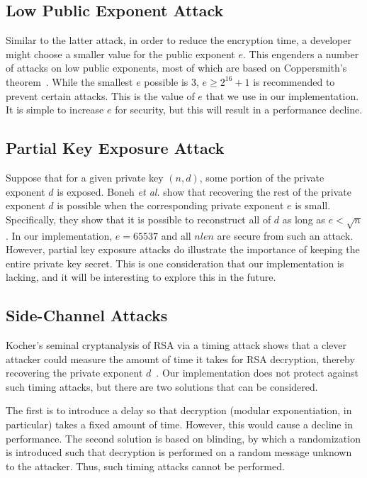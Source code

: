 \documentclass[a4paper]{article}
\begin{document}
\subsection{Low Public Exponent Attack}

Similar to the latter attack, in order to reduce the encryption time, a developer might choose a smaller value for the public exponent $e$. This engenders a number of attacks on low public exponents, most of which are based on Coppersmith's theorem~\cite{coppersmith1997small}. While the smallest $e$ possible is 3, $e \geq 2^{16} + 1$ is recommended to prevent certain attacks. This is the value of $e$ that we use in our implementation. It is simple to increase $e$ for security, but this will result in a performance decline.

\subsection{Partial Key Exposure Attack}

Suppose that for a given private key $(n,d)$, some portion of the private exponent $d$ is exposed. Boneh \emph{et al.} show that recovering the rest of the private exponent $d$ is possible when the corresponding private exponent $e$ is small. Specifically, they show that it is possible to reconstruct all of $d$ as long as $e < \sqrt{n}$. In our implementation, $e = 65537$ and all $nlen$ are secure from such an attack. However, partial key exposure attacks do illustrate the importance
of keeping the entire private key secret. This is one consideration that our implementation is lacking, and it will be interesting to explore this in the future.

\subsection{Side-Channel Attacks}

Kocher's seminal cryptanalysis of RSA via a timing attack shows that a clever attacker could measure the amount of time it takes for RSA decryption, thereby recovering the private exponent $d$~\cite{kocher1996timing}. Our implementation does not protect against such timing attacks, but there are two solutions that can be considered.

The first is to introduce a delay so that decryption (modular exponentiation, in particular) takes a fixed amount of time. However, this would cause a decline in performance. The second solution is based on blinding, by which a randomization is introduced such that decryption is performed on a random message unknown to the attacker. Thus, such timing attacks cannot be performed.
\end{document}
